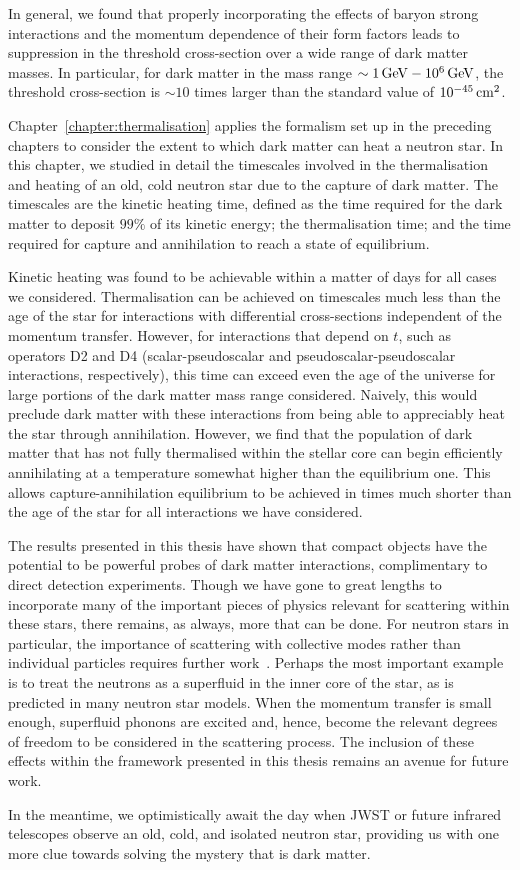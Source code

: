 In general, we found that properly incorporating the effects of baryon strong interactions and the momentum dependence of their form factors leads to suppression in the threshold cross-section over a wide range of dark matter masses. In particular, for dark matter in the mass range $\sim 1{\rm \,GeV}-10^6{\rm \,GeV}$, the threshold cross-section is $\sim 10$ times larger than the standard value of $10^{-45}{\rm \,cm}^2$. 

Chapter~\ref{chapter:thermalisation} applies the formalism set up in the preceding chapters to consider the extent to which dark matter can heat a neutron star. In this chapter, we studied in detail the timescales involved in the thermalisation and heating of an old, cold neutron star due to the capture of dark matter. The timescales are the kinetic heating time, defined as the time required for the dark matter to deposit $99\%$ of its kinetic energy; the thermalisation time; and the time required for capture and annihilation to reach a state of equilibrium. 

Kinetic heating was found to be achievable within a matter of days for all cases we considered. Thermalisation can be achieved on timescales much less than the age of the star for interactions with differential cross-sections independent of the momentum transfer. However, for interactions that depend on $t$, such as operators D2 and D4 (scalar-pseudoscalar and pseudoscalar-pseudoscalar interactions, respectively), this time can exceed even the age of the universe for large portions of the dark matter mass range considered. Naively, this would preclude dark matter with these interactions from being able to appreciably heat the star through annihilation.
However, we find that the population of dark matter that has not fully thermalised within the stellar core can begin efficiently annihilating at a temperature somewhat higher than the equilibrium one. This allows capture-annihilation equilibrium to be achieved in times much shorter than the age of the star for all interactions we have considered. 

The results presented in this thesis have shown that compact objects have the potential to be powerful probes of dark matter interactions, complimentary to direct detection experiments. Though we have gone to great lengths to incorporate many of the important pieces of physics relevant for scattering within these stars, there remains, as always, more that can be done. For neutron stars in particular, the importance of scattering with collective modes rather than individual particles requires further work~\cite{DeRocco:2022rze_may_Darkmatterscattering}. Perhaps the most important example is to treat the neutrons as a superfluid in the inner core of the star, as is predicted in many neutron star models. When the momentum transfer is small enough, superfluid phonons are excited and, hence, become the relevant degrees of freedom to be considered in the scattering process. The inclusion of these effects within the framework presented in this thesis remains an avenue for future work. 

In the meantime, we optimistically await the day when JWST or future infrared telescopes observe an old, cold, and isolated neutron star, providing us with one more clue towards solving the mystery that is dark matter.